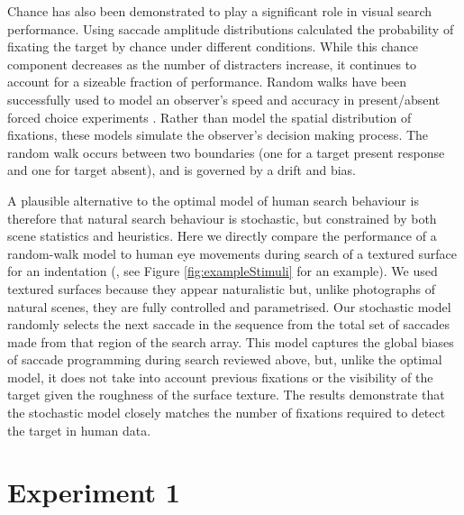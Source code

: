 \documentclass[man]{apa6}
\begin{document}
Chance has also been demonstrated to play a significant role in visual search performance. Using saccade amplitude distributions \textcite{motter-holsapple2001} calculated the probability of fixating the target by chance under different conditions. While this chance component decreases as the number of distracters increase, it continues to account for a sizeable fraction of performance. Random walks have been successfully used to model an observer's speed and accuracy in present/absent forced choice experiments \parencite{stone1960, reeves2005}. Rather than model the spatial distribution of fixations, these models simulate the observer's decision making process. The random walk occurs between two boundaries (one for a target present response and one for target absent), and is governed by a drift and bias. 

A plausible alternative to the optimal model of human search behaviour is therefore that natural search behaviour is stochastic, but constrained by both scene statistics and heuristics.  Here we directly compare the performance of a random-walk model to human eye movements during search of a textured surface  for an indentation (\textcite{clarke2008}, see Figure \ref{fig:exampleStimuli} for an example). We used textured surfaces because they appear naturalistic but, unlike photographs of natural scenes, they are fully controlled and parametrised. Our stochastic model randomly selects the next saccade in the sequence from the total set of saccades made from that region of the search array. This model captures the global biases of saccade programming during search reviewed above, but, unlike the optimal model, it does not take into account previous fixations or the visibility of the target given the roughness of the surface texture. The results demonstrate that the stochastic model closely matches the number of fixations required to detect the target in human data.

\section{Experiment 1}
\label{sec:mainExperiment}
\end{document}
